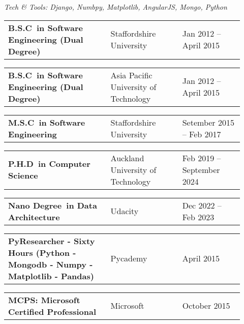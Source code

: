 \documentclass[10pt,a4paper,ragged2e,withhyper]{altacv}
\renewcommand{\cvevent}[4]{%
  \textbf{#1} %
  \hfill %
  \begin{minipage}[t]{.5\linewidth}
    \raggedleft %
    \small#3 %
    \\ %
    #4 %
  \end{minipage}
  \vspace{\baselineskip} %
}
\begin{document}
\vspace{0.5cm}

\textit{Tech \& Tools: Django, Numbpy, Matplotlib, AngularJS, Mongo, Python}


\vspace{0.5cm}



\renewcommand{\cvevent}[4]{%
  \noindent
  \begin{tabular}{@{}p{0.4\linewidth}p{0.28\linewidth}p{0.2433\linewidth}@{}}
    \small\textbf{#1} & %
    \small{#2} & %
    \raggedleft\arraybackslash\small{#3} %
  \end{tabular}
  \par %
  \vspace{0.5em} %
}








\cvevent{B.S.C\ in Software Engineering (Dual Degree)}{Staffordshire University}{Jan 2012 -- April 2015}{}

\divider

\cvevent{B.S.C\ in Software Engineering (Dual Degree)}{Asia Pacific University of Technology}{Jan 2012 -- April 2015}{}

\divider

\cvevent{M.S.C\ in Software Engineering}{Staffordshire University}{Setember 2015 -- Feb 2017}{}

\divider

\cvevent{P.H.D\ in Computer Science}{Auckland University of Technology}{Feb 2019 -- September 2024}{}

\divider

\cvevent{Nano Degree\ in Data Architecture}{Udacity}{Dec 2022 -- Feb 2023}{}



\vspace{0.5cm}


\cvevent{PyResearcher - Sixty Hours (Python - Mongodb - Numpy - Matplotlib - Pandas)}{Pycademy}{April 2015}{}

\divider

\cvevent{MCPS: Microsoft Certified Professional}{Microsoft}{October 2015}{}
\end{document}
